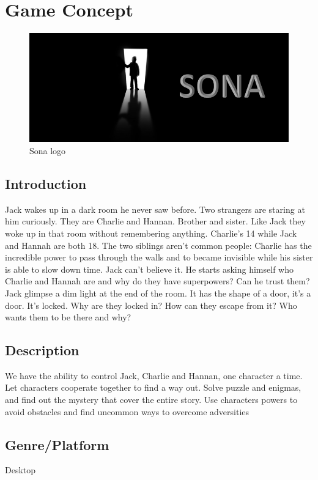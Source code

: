 \section{Game Concept} \label{sec:gameconcept}
\begin{figure}[!h]
\centering
\includegraphics[width=\textwidth]{Images/Sona_Logo.png}
\caption[Sona]{Sona logo}
\label{fig:Sona logo}
\end{figure}
\subsection{Introduction} \label{sec:introduction}
Jack wakes up in a dark room he never saw before. Two strangers are staring at him curiously.
They are Charlie and Hannan. Brother and sister. Like Jack they woke up in that room without remembering
anything. Charlie’s 14 while Jack and Hannah are both 18.
The two siblings aren’t common people: Charlie has the incredible power to pass through the walls and to
became invisible while his sister is able to slow down time. Jack can’t believe it.
He starts asking himself who Charlie and Hannah are and why do they have superpowers? Can he trust them?
Jack glimpse a dim light at the end of the room. It has the shape of a door, it’s a door.
It’s locked. Why are they locked in? How can they escape from it?
Who wants them to be there and why?
\subsection{Description} \label{sec:description}
We have the ability to control Jack, Charlie and
Hannan, one character a time.
Let characters cooperate together to find a way out. Solve
puzzle and enigmas, and find out the mystery that cover the
entire story.
Use characters powers to avoid obstacles and find uncommon
ways to overcome adversities
\subsection{Genre/Platform} \label{sec:genreplatform}
 Desktop 
